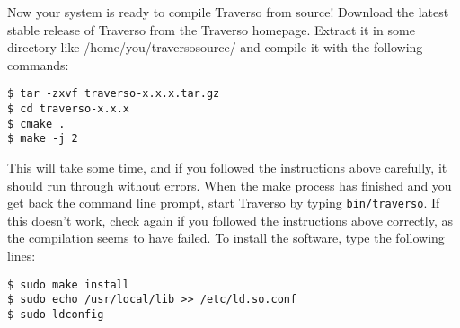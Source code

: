 Now your system is ready to compile Traverso from source! Download the latest stable release of Traverso from the Traverso homepage. Extract it in some directory like /home/you/traversosource/ and compile it with the following commands:

\begin{verbatim}
$ tar -zxvf traverso-x.x.x.tar.gz
$ cd traverso-x.x.x
$ cmake .
$ make -j 2
\end{verbatim}

This will take some time, and if you followed the instructions above carefully, it should run through without errors. When the make process has finished and you get back the  command line prompt, start Traverso by typing \texttt{bin/traverso}. If this doesn't work, check again if you followed the instructions above correctly, as the compilation seems to have failed. To  install the software, type the following lines:

\begin{verbatim}
$ sudo make install
$ sudo echo /usr/local/lib >> /etc/ld.so.conf
$ sudo ldconfig
\end{verbatim}
